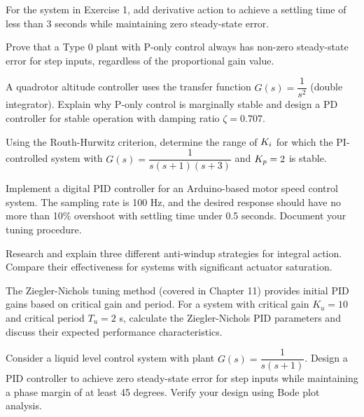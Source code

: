 \begin{exercise}
For the system in Exercise 1, add derivative action to achieve a settling time of less than 3 seconds while maintaining zero steady-state error.
\end{exercise}

\begin{exercise}
Prove that a Type 0 plant with P-only control always has non-zero steady-state error for step inputs, regardless of the proportional gain value.
\end{exercise}

\begin{exercise}
A quadrotor altitude controller uses the transfer function $G(s) = \dfrac{1}{s^2}$ (double integrator). Explain why P-only control is marginally stable and design a PD controller for stable operation with damping ratio $\zeta = 0.707$.
\end{exercise}

\begin{exercise}
Using the Routh-Hurwitz criterion, determine the range of $K_i$ for which the PI-controlled system with $G(s) = \dfrac{1}{s(s+1)(s+3)}$ and $K_p = 2$ is stable.
\end{exercise}

\begin{exercise}
Implement a digital PID controller for an Arduino-based motor speed control system. The sampling rate is 100 Hz, and the desired response should have no more than 10\% overshoot with settling time under 0.5 seconds. Document your tuning procedure.
\end{exercise}

\begin{exercise}
Research and explain three different anti-windup strategies for integral action. Compare their effectiveness for systems with significant actuator saturation.
\end{exercise}

\begin{exercise}
The Ziegler-Nichols tuning method (covered in Chapter 11) provides initial PID gains based on critical gain and period. For a system with critical gain $K_u = 10$ and critical period $T_u = 2$ s, calculate the Ziegler-Nichols PID parameters and discuss their expected performance characteristics.
\end{exercise}

\begin{exercise}
Consider a liquid level control system with plant $G(s) = \dfrac{1}{s(s+1)}$. Design a PID controller to achieve zero steady-state error for step inputs while maintaining a phase margin of at least 45 degrees. Verify your design using Bode plot analysis.
\end{exercise}

